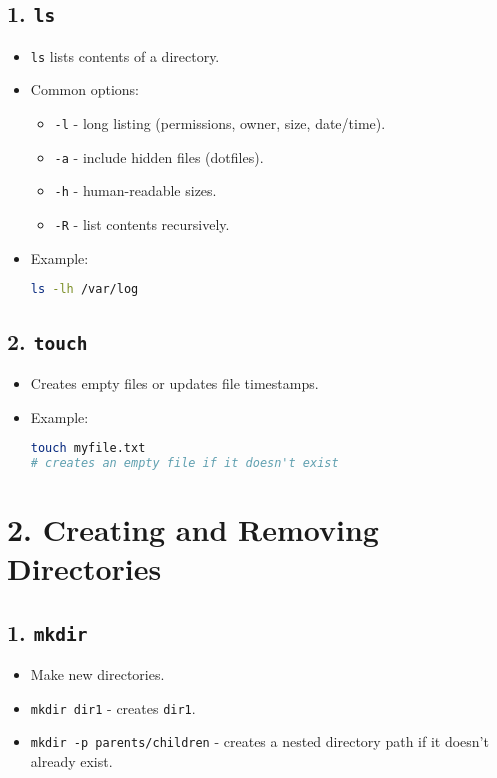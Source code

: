 \documentclass[a4paper]{report}
\begin{document}
\subsection*{1. \texttt{ls}}
\begin{itemize}
    \item \texttt{ls} lists contents of a directory.
    \item Common options:
    \begin{itemize}
        \item \texttt{-l} \text{-}- long listing (permissions, owner, size, date/time).
        \item \texttt{-a} \text{-}- include hidden files (dotfiles).
        \item \texttt{-h} \text{-}- human-readable sizes.
        \item \texttt{-R} \text{-}- list contents recursively.
    \end{itemize}
    \item Example:
\begin{lstlisting}[language=bash]
ls -lh /var/log
\end{lstlisting}
\end{itemize}

\subsection*{2. \texttt{touch}}
\begin{itemize}
    \item Creates empty files or updates file timestamps.
    \item Example:
\begin{lstlisting}[language=bash]
touch myfile.txt
# creates an empty file if it doesn't exist
\end{lstlisting}
\end{itemize}

\section*{2. Creating and Removing Directories}
\subsection*{1. \texttt{mkdir}}
\begin{itemize}
    \item Make new directories.
    \item \texttt{mkdir dir1} \text{-}- creates \texttt{dir1}.
    \item \texttt{mkdir -p parents/children} \text{-}- creates a nested directory path if it doesn’t already exist.
\end{itemize}
\end{document}
